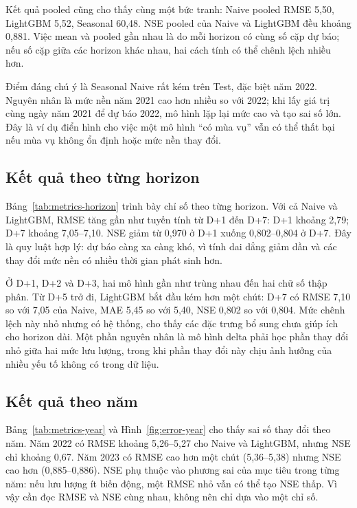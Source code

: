 Kết quả pooled cũng cho thấy cùng một bức tranh: Naive pooled RMSE 5,50, LightGBM
5,52, Seasonal 60,48. NSE pooled của Naive và LightGBM đều khoảng 0,881. Việc mean
và pooled gần nhau là do mỗi horizon có cùng số cặp dự báo; nếu số cặp giữa các
horizon khác nhau, hai cách tính có thể chênh lệch nhiều hơn.

Điểm đáng chú ý là Seasonal Naive rất kém trên Test, đặc biệt năm 2022. Nguyên nhân
là mức nền năm 2021 cao hơn nhiều so với 2022; khi lấy giá trị cùng ngày năm 2021
để dự báo 2022, mô hình lặp lại mức cao và tạo sai số lớn. Đây là ví dụ điển hình
cho việc một mô hình “có mùa vụ” vẫn có thể thất bại nếu mùa vụ không ổn định hoặc
mức nền thay đổi.

\subsection{Kết quả theo từng horizon}

Bảng~\ref{tab:metrics-horizon} trình bày chỉ số theo từng horizon. Với cả Naive và LightGBM, RMSE tăng gần như tuyến tính từ D+1
đến D+7: D+1 khoảng 2,79; D+7 khoảng 7,05--7,10. NSE giảm từ 0,970 ở D+1 xuống
0,802--0,804 ở D+7. Đây là quy luật hợp lý: dự báo càng xa càng khó, vì tính dai
dẳng giảm dần và các thay đổi mức nền có nhiều thời gian phát sinh hơn.

\begin{table}[H]
\centering
\small

\caption{Chỉ số theo horizon trên Test 2022--2023.}
\label{tab:metrics-horizon}
\end{table}

Ở D+1, D+2 và D+3, hai mô hình gần như trùng nhau đến hai chữ số thập phân. Từ D+5
trở đi, LightGBM bắt đầu kém hơn một chút: D+7 có RMSE 7,10 so với 7,05 của Naive,
MAE 5,45 so với 5,40, NSE 0,802 so với 0,804. Mức chênh lệch này nhỏ nhưng có hệ
thống, cho thấy các đặc trưng bổ sung chưa giúp ích cho horizon dài. Một phần nguyên
nhân là mô hình delta phải học phần thay đổi nhỏ giữa hai mức lưu lượng, trong khi
phần thay đổi này chịu ảnh hưởng của nhiều yếu tố không có trong dữ liệu.

\subsection{Kết quả theo năm}

Bảng~\ref{tab:metrics-year} và Hình~\ref{fig:error-year} cho thấy sai số thay đổi
theo năm. Năm 2022 có RMSE khoảng 5,26--5,27 cho Naive và LightGBM, nhưng NSE chỉ
khoảng 0,67. Năm 2023 có RMSE cao hơn một chút (5,36--5,38) nhưng NSE cao hơn
(0,885--0,886). NSE phụ thuộc vào phương sai của mục tiêu trong từng năm: nếu lưu
lượng ít biến động, một RMSE nhỏ vẫn có thể tạo NSE thấp. Vì vậy cần đọc RMSE và
NSE cùng nhau, không nên chỉ dựa vào một chỉ số.

